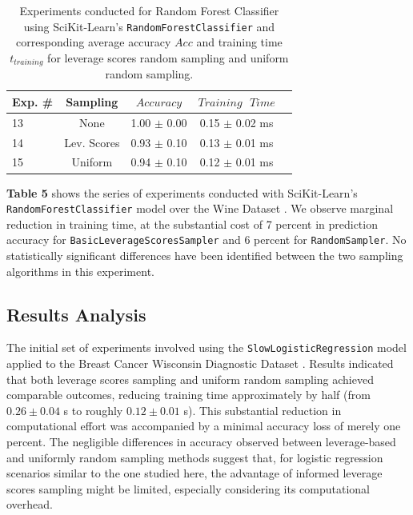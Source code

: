 \documentclass{article}
\theoremstyle{plain}
\theoremstyle{definition}
\theoremstyle{remark}
\begin{document}
\begin{table}[t]
	\caption{Experiments conducted for Random Forest Classifier using SciKit-Learn's \texttt{RandomForestClassifier} and corresponding average accuracy $Acc$ and training time $t_{training}$ for leverage scores random sampling and uniform random sampling.}
	\label{t5}
	\vskip 0.15in
	\begin{center}
		\begin{small}
			\begin{sc}
				\begin{tabular}{lcccr}
					\toprule
					Exp. \# & Sampling & $Accuracy$ & $Training \text{ } Time$\\
					\midrule
					13 & None & 1.00 $\pm$ 0.00 & 0.15 $\pm$ 0.02 ms \\
					14 & Lev. Scores & 0.93 $\pm$ 0.10 & 0.13 $\pm$ 0.01 ms \\
					15 & Uniform & 0.94 $\pm$ 0.10 & 0.12 $\pm$ 0.01 ms \\
					\bottomrule
				\end{tabular}
			\end{sc}
		\end{small}
	\end{center}
	\vskip -0.1in
\end{table}

\textbf{Table 5} shows the series of experiments conducted with SciKit-Learn's \texttt{RandomForestClassifier} model over the Wine Dataset \cite{wine}. We observe marginal reduction in training time, at the substantial cost of 7 percent in prediction accuracy for \texttt{BasicLeverageScoresSampler} and 6 percent for \texttt{RandomSampler}. No statistically significant differences have been identified between the two sampling algorithms in this experiment.


\subsection{Results Analysis}

The initial set of experiments involved using the \texttt{SlowLogisticRegression} model applied to the Breast Cancer Wisconsin Diagnostic Dataset \cite{breastcancer}. Results indicated that both leverage scores sampling and uniform random sampling achieved comparable outcomes, reducing training time approximately by half (from $0.26 \pm 0.04$ s to roughly $0.12 \pm 0.01$ s). This substantial reduction in computational effort was accompanied by a minimal accuracy loss of merely one percent. The negligible differences in accuracy observed between leverage-based and uniformly random sampling methods suggest that, for logistic regression scenarios similar to the one studied here, the advantage of informed leverage scores sampling might be limited, especially considering its computational overhead.
\end{document}
